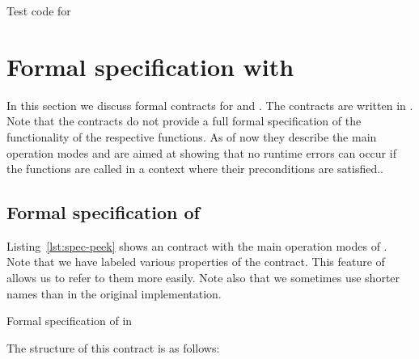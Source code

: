 \clearpage

\begin{listing}[hbt]
\begin{minipage}{\textwidth}

\end{minipage}
\caption{\label{lst:test_poke} Test code for \poke}
\end{listing}

\clearpage

\section{Formal specification with \acsl}
\label{sec:formal-specification}

In this section we discuss formal contracts for \peek and \poke.
The contracts are written in \acsl.
Note that the contracts do not provide a full formal specification
of the functionality of the respective functions.
As of now they describe the main operation modes and are aimed at showing
that no runtime errors can occur if the functions are called 
in a context where their preconditions are satisfied..

\subsection{Formal specification of \peek}
\label{sec:formal-specification-peek}


Listing~\ref{lst:spec-peek} shows an \acsl contract with the 
main operation modes of \peek.
Note that we have labeled various properties of the contract.
This feature of \acsl allows us to refer to them more easily.
Note also that we sometimes use shorter names than in the original implementation.

\begin{listing}[hbt]
\begin{minipage}{\textwidth}

\end{minipage}
\caption{\label{lst:spec-peek} Formal specification of \peek in \acsl}
\end{listing}

The structure of this contract is as follows:


